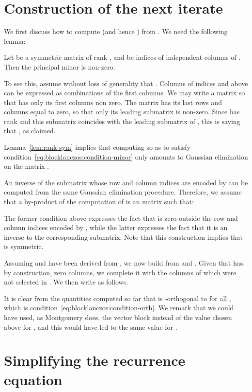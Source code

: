\section{Construction of the next iterate}
We first discuss how to compute  (and hence
) from . 
    We need the following lemma:
\begin{lemma}
    \label{lem:rank-sym}
    Let  be a symmetric matrix of rank
    , and  be indices of  independent
    columns of . Then the principal minor  is
    non-zero.
\end{lemma}
To see this, assume without loss of generality that .
Columns of indices  and above can be expressed as combinations of
the first  columns. 
We may write a matrix  so
that  has only its  first columns non zero.
The matrix  has its last  rows
and columns equal to zero,
so that only its
leading  submatrix is non-zero. Since
 has rank  and this submatrix coincides with the leading
 submatrix of , this is saying that
, as claimed.
\medskip

Lemma~\ref{lem:rank-sym} implies that computing  so as to
satisfy condition~\eqref{eq:blocklanczos:condition-minor}
only amounts to Gaussian elimination on the  matrix
.

An inverse of the submatrix whose row and column indices are encoded by
 can be computed from the same Gaussian elimination procedure.
Therefore, we assume that a by-product of the computation of
 is an  matrix  such that:

The former condition above expresses the fact that  is zero
outside the row and column indices encoded by , while the latter
expresses the fact that it is an inverse to the corresponding submatrix.
Note that this construction implies that  is symmetric.
\medskip


Assuming  and  have been derived from
, we now build  from  and . Given that
 has, by construction,  zero columns, we
complete it with the columns of  which were not selected in
. We then write 
as follows.

It is clear from the quantities computed so far that  is
-orthogonal to  for all , which is
condition~\eqref{eq:blocklanczos:condition-orth}.  We remark that we
could have used, as Montgomery does, the vector block
 instead of the value chosen above for
, and this would have led to the same value for
.


\section{Simplifying the recurrence equation}

